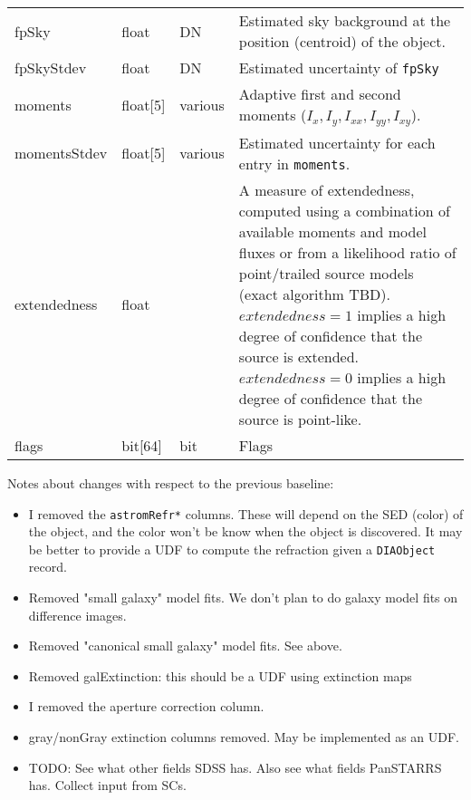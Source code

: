 \documentclass[12pt]{article}
\newcommand{\code}[1]{\texttt{#1}}
\newcommand{\DIAObject}{\code{DIAObject}\xspace}
\begin{document}
\begin{center}
\begin{longtable}{p{3cm}p{2cm}p{2cm}p{5cm}}
fpSky & float & DN & Estimated sky background at the position (centroid) of the object. \\ 

fpSkyStdev & float & DN & Estimated uncertainty of \texttt{fpSky} \\ 



moments & float[5] & various & Adaptive first and second moments ($I_{x}, I_{y}, I_{xx}, I_{yy}, I_{xy}$). \\ 

momentsStdev & float[5] & various & Estimated uncertainty for each entry in \texttt{moments}. \\ 

extendedness & float & ~ & A measure of extendedness, computed using a combination of available moments and model fluxes or from a likelihood ratio of point/trailed source models (exact algorithm TBD). $extendedness=1$ implies a high degree of confidence that the source is extended. $extendedness=0$ implies a high degree of confidence that the source is point-like. \\

flags & bit[64] & bit & Flags \\ \hline
\end{longtable}
\end{center}

Notes about changes with respect to the previous baseline:
\begin{itemize}
\item I removed the \texttt{astromRefr*} columns. These will depend on the SED (color) of the object, and the color won't be know when the object is discovered. It may be better to provide a UDF to compute the refraction given a \DIAObject record.
\item Removed "small galaxy" model fits. We don't plan to do galaxy model fits on difference images.
\item Removed "canonical small galaxy" model fits. See above.
\item Removed galExtinction: this should be a UDF using extinction maps
\item I removed the aperture correction column.
\item gray/nonGray extinction columns removed. May be implemented as an UDF.
\item TODO: See what other fields SDSS has. Also see what fields PanSTARRS has. Collect input from SCs.
\end{itemize}
\end{document}
